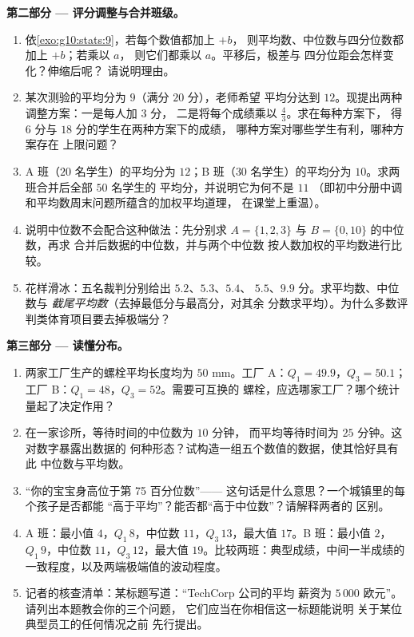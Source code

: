 \begin{problem}
\medskip
\noindent\textbf{第二部分 --- 评分调整与合并班级。}
\begin{enumerate}[resume]
  \item 依\cref{exo:g10:stats:9}，若每个数值都加上 $+b$，
        则平均数、中位数与四分位数都加上 $+b$；若乘以 $a$，
        则它们都乘以 $a$。平移后，极差与
        四分位距会怎样变化？伸缩后呢？
        请说明理由。
  \item 某次测验的平均分为 $9$（满分 $20$ 分），老师希望
        平均分达到 $12$。现提出两种调整方案：一是每人加 $3$ 分，
        二是将每个成绩乘以 $\frac43$。求在每种方案下，
        得 $6$ 分与 $18$ 分的学生在两种方案下的成绩，
        哪种方案对哪些学生有利，哪种方案存在
        上限问题？
  \item A 班（$20$ 名学生）的平均分为 $12$；B 班（$30$
        名学生）的平均分为 $10$。求两班合并后全部 $50$ 名学生的
        平均分，并说明它为何不是 $11$
        （即初中分册中调和平均数周末问题所蕴含的加权平均道理，
        在课堂上重温）。
  \item 说明中位数不会配合这种做法：先分别求
        $A = \{1, 2, 3\}$ 与 $B = \{0, 10\}$ 的中位数，再求
        合并后数据的中位数，并与两个中位数
        按人数加权的平均数进行比较。
  \item 花样滑冰：五名裁判分别给出 $5.2$、$5.3$、$5.4$、
        $5.5$、$9.9$ 分。求平均数、中位数与
        \emph{截尾平均数}（去掉最低分与最高分，对其余
        分数求平均）。为什么多数评判类体育项目要去掉极端分？
\end{enumerate}

\medskip
\noindent\textbf{第三部分 --- 读懂分布。}
\begin{enumerate}[resume]
  \item 两家工厂生产的螺栓平均长度均为
        $50$ mm。工厂 A：$Q_1 = 49.9$，$Q_3 = 50.1$；工厂
        B：$Q_1 = 48$，$Q_3 = 52$。需要可互换的
        螺栓，应选哪家工厂？哪个统计量起了决定作用？
  \item 在一家诊所，等待时间的中位数为 $10$ 分钟，
        而平均等待时间为 $25$ 分钟。这对数字暴露出数据的
        何种形态？试构造一组五个数值的数据，使其恰好具有此
        中位数与平均数。
  \item “你的宝宝身高位于第 75 百分位数”——
        这句话是什么意思？一个城镇里的每个孩子是否都能
        “高于平均”？能否都“高于中位数”？请解释两者的
        区别。
  \item A 班：最小值 $4$，$Q_1\,8$，中位数 $11$，$Q_3\,13$，最大值
        $17$。B 班：最小值 $2$，$Q_1\,9$，中位数 $11$，$Q_3\,12$，最大值
        $19$。比较两班：典型成绩，中间一半成绩的
        一致程度，以及两端极端值的波动程度。
  \item 记者的核查清单：某标题写道：“TechCorp 公司的平均
        薪资为 $5\,000$ 欧元”。请列出本题教会你的三个问题，
        它们应当在你相信这一标题能说明
        关于某位典型员工的任何情况之前
        先行提出。
\end{enumerate}


\end{problem}
